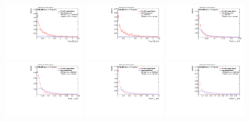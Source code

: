 \begin{figure}
\includegraphics[width=0.3\textwidth]{sascha_input/Appendix/Distributions/w/distributions/beta3/h_normal_tj_D2_3_bin5.pdf} \hspace{1mm}
\includegraphics[width=0.3\textwidth]{sascha_input/Appendix/Distributions/w/distributions/beta3/h_normal_tj_D2_3_bin6.pdf}
\bigskip
\includegraphics[width=0.3\textwidth]{sascha_input/Appendix/Distributions/w/distributions/beta3/h_normal_tj_nSub21_3_bin1.pdf} \hspace{1mm}
\includegraphics[width=0.3\textwidth]{sascha_input/Appendix/Distributions/w/distributions/beta3/h_normal_tj_nSub21_3_bin2.pdf} \hspace{1mm}
\includegraphics[width=0.3\textwidth]{sascha_input/Appendix/Distributions/w/distributions/beta3/h_normal_tj_nSub21_3_bin3.pdf} 
\bigskip
\includegraphics[width=0.3\textwidth]{sascha_input/Appendix/Distributions/w/distributions/beta3/h_normal_tj_nSub21_3_bin4.pdf} \hspace{6mm}

\end{figure}
